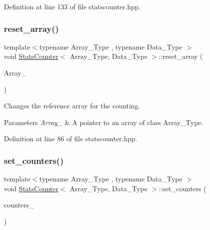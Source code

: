 Definition at line 133 of file statscounter.\+hpp.

\mbox{\label{class_stats_counter_a8dabc3a7a9931acbb76900a67d728f70}} 
\subsubsection{\texorpdfstring{reset\+\_\+array()}{reset\_array()}}
{\footnotesize\ttfamily template$<$typename Array\+\_\+\+Type , typename Data\+\_\+\+Type $>$ \\
void \hyperlink{class_stats_counter}{Stats\+Counter}$<$ Array\+\_\+\+Type, Data\+\_\+\+Type $>$\+::reset\+\_\+array (\begin{DoxyParamCaption}\item[{const Array\+\_\+\+Type $\ast$}]{Array\+\_\+ }\end{DoxyParamCaption})\hspace{0.3cm}{\ttfamily [inline]}}



Changes the reference array for the counting. 


\begin{DoxyParams}{Parameters}
{\em Array\+\_\+} & A pointer to an array of class {\ttfamily Array\+\_\+\+Type}. \\
\hline
\end{DoxyParams}


Definition at line 86 of file statscounter.\+hpp.

\mbox{\label{class_stats_counter_a6aae81ab39ef452aedd7743fa8221855}} 
\subsubsection{\texorpdfstring{set\+\_\+counters()}{set\_counters()}}
{\footnotesize\ttfamily template$<$typename Array\+\_\+\+Type , typename Data\+\_\+\+Type $>$ \\
void \hyperlink{class_stats_counter}{Stats\+Counter}$<$ Array\+\_\+\+Type, Data\+\_\+\+Type $>$\+::set\+\_\+counters (\begin{DoxyParamCaption}\item[{\hyperlink{class_counter_vector}{Counter\+Vector}$<$ Array\+\_\+\+Type, Data\+\_\+\+Type $>$ $\ast$}]{counters\+\_\+ }\end{DoxyParamCaption})\hspace{0.3cm}{\ttfamily [inline]}}



